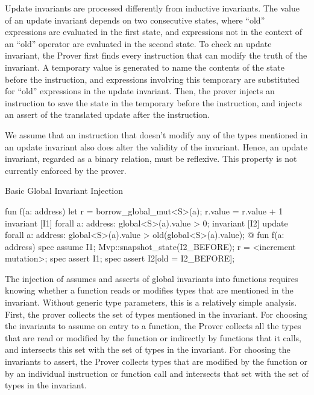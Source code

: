 Update invariants are processed differently from inductive invariants.
The value of an update invariant depends on two consecutive states, where
``old'' expressions are evaluated in the first state, and expressions
not in the context of an ``old'' operator are evaluated in the second
state.
To check an update invariant, the Prover first finds every
instruction that can modify the truth of the invariant. A temporary
value is generated to name the contents of the state before the
instruction, and expressions involving this temporary are substituted
for ``old'' expressions in the update invariant.
Then, the prover injects an instruction to save the state in the
temporary before the instruction, and injects an assert of
the translated update after the instruction.


We assume that an instruction that doesn't modify any of the types
mentioned in an update invariant also does alter the validity of the invariant.
Hence, an update invariant, regarded as a binary relation, must be reflexive.
This property is not currently enforced by the prover.


\begin{Figure}
  \caption{Basic Global Invariant Injection}
  \label{fig:GlobalInvariants}
  \centering
\begin{MoveBox}
  fun f(a: address) {
    let r = borrow_global_mut<S>(a);
    r.value = r.value + 1
  }
  invariant [I1] forall a: address: global<S>(a).value > 0;
  invariant [I2] update forall a: address:
      global<S>(a).value > old(global<S>(a).value);
  @\transform@
  fun f(a: address) {
    spec assume I1;
    Mvp::snapshot_state(I2_BEFORE);
    r = <increment mutation>;
    spec assert I1;
    spec assert I2[old = I2_BEFORE];
  }
\end{MoveBox}
\end{Figure}



The injection of assumes and asserts of global invariants into
functions requires knowing whether a function reads or modifies types
that are mentioned in the invariant.  Without generic type parameters,
this is a relatively simple analysis. First, the prover collects the
set of types mentioned in the invariant.
For choosing the invariants to
assume on entry to a function, the Prover collects all the types that
are read or modified by the function or indirectly by functions that it
calls, and intersects this set with the set of types in the invariant.
For choosing the invariants to assert, the Prover collects types that
are modified by the function or by an individual instruction or function
call and intersects that set with the set of types in the invariant.

